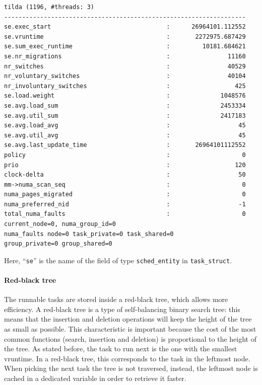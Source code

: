 \begin{verbatim}
tilda (1196, #threads: 3)
-------------------------------------------------------------------
se.exec_start                                :      26964101.112552
se.vruntime                                  :       2272975.687429
se.sum_exec_runtime                          :         10181.684621
se.nr_migrations                             :                11160
nr_switches                                  :                40529
nr_voluntary_switches                        :                40104
nr_involuntary_switches                      :                  425
se.load.weight                               :              1048576
se.avg.load_sum                              :              2453334
se.avg.util_sum                              :              2417183
se.avg.load_avg                              :                   45
se.avg.util_avg                              :                   45
se.avg.last_update_time                      :       26964101112552
policy                                       :                    0
prio                                         :                  120
clock-delta                                  :                   50
mm->numa_scan_seq                            :                    0
numa_pages_migrated                          :                    0
numa_preferred_nid                           :                   -1
total_numa_faults                            :                    0
current_node=0, numa_group_id=0
numa_faults node=0 task_private=0 task_shared=0 
group_private=0 group_shared=0
\end{verbatim}
Here, ``\verb|se|'' is the name of the field of type \verb|sched_entity| in \verb|task_struct|.

\paragraph{Red-black tree}
The runnable tasks are stored inside a red-black tree, which allows more efficiency. A red-black tree is a type of self-balancing binary search tree: this means that the insertion and deletion operations will keep the height of the tree as small as possible. This characteristic is important because the cost of the most common functions (search, insertion and deletion) is proportional to the height of the tree.
As stated before, the task to run next is the one with the smallest vruntime. In a red-black tree, this corresponds to the task in the leftmost node. When picking the next task the tree is not traversed, instead, the leftmost node is cached in a dedicated variable in order to retrieve it faster.

